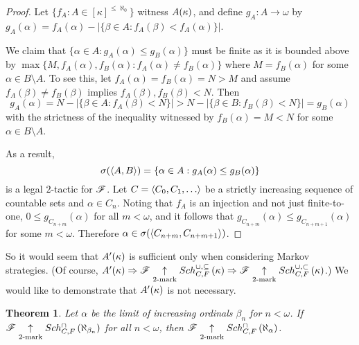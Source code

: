 \documentclass{amsart}
\theoremstyle{plain}
\newtheorem{theorem}{Theorem}
\theoremstyle{definition}
\theoremstyle{remark}
\theoremstyle{plain}
\theoremstyle{definition}
\theoremstyle{remark}
\begin{document}
  \begin{proof}
    Let \(\{f_A:A\in[\kappa]^{\leq\aleph_0}\}\) witness
    \(A(\kappa)\), and define \(g_A:A\to\omega\) by
    \(g_A(\alpha)=f_A(\alpha)-|\{\beta\in A:f_A(\beta)<f_A(\alpha)\}|\).

    We claim that \(\{\alpha\in A:g_A(\alpha)\leq g_B(\alpha)\}\)
    must be finite as it is bounded above by
    \(\max\{M,f_A(\alpha),f_B(\alpha):f_A(\alpha)\not=f_B(\alpha)\}\)
    where \(M=f_B(\alpha)\) for some \(\alpha\in B\setminus A\).
    To see this, let \(f_A(\alpha)=f_B(\alpha)=N>M\) and assume
    \(f_A(\beta)\not=f_B(\beta)\) implies \(f_A(\beta),f_B(\beta)<N\).
    Then
    \[
      g_A(\alpha)
        =
      N-|\{\beta\in A:f_A(\beta)<N\}|
        >
      N-|\{\beta\in B:f_B(\beta)<N\}|
        =
      g_B(\alpha)
    \]
    with the strictness of the inequality witnessed by \(f_B(\alpha)=M<N\)
    for some \(\alpha\in B\setminus A\).

    As a result,
    \[
      \sigma(\langle A,B\rangle)
        =
      \{\alpha\in A:g_A(\alpha)\leq g_B(\alpha)\}
    \]
    is a legal \(2\)-tactic for \(\mathscr{F}\). Let \(C=\<C_0,C_1,\dots\>\) be
    a strictly increasing sequence of countable sets and
    \(\alpha\in C_n\). Noting that \(f_A\) is an injection and not
    just finite-to-one, \(0\leq g_{C_{n+m}}(\alpha)\) for all
    \(m<\omega\), and it follows that
    \(g_{C_{n+m}}(\alpha)\leq g_{C_{n+m+1}}(\alpha)\) for some \(m<\omega\).
    Therefore \(\alpha\in\sigma(\langle C_{n+m},C_{n+m+1}\rangle)\).
  \end{proof}

  So it would seem that \(A'(\kappa)\) is sufficient only when
  considering Markov strategies. (Of course,
  \(A'(\kappa)\Rightarrow\mathscr{F}\underset{2\text{-mark}}{\uparrow}Sch^{\cup,\subseteq}_{C,F}\left({\kappa}\right)
  \Rightarrow\mathscr{F}\underset{2\text{-mark}}{\uparrow}Sch^{\cup,\subset}_{C,F}\left({\kappa}\right)\).)
  We would like to demonstrate that \(A'(\kappa)\) is not
  necessary.

  \begin{theorem}
    Let \(\alpha\) be the limit of increasing ordinals \(\beta_n\) for \(n<\omega\).
    If \(\mathscr{F} \underset{2\text{-mark}}{\uparrow}Sch^{\cap}_{C,F}\left({\aleph_{\beta_n}}\right)\) for all
    \(n<\omega\), then \(\mathscr{F}\underset{2\text{-mark}}{\uparrow}Sch^{\cap}_{C,F}\left({\aleph_\alpha}\right)\).
  \end{theorem}
\end{document}
